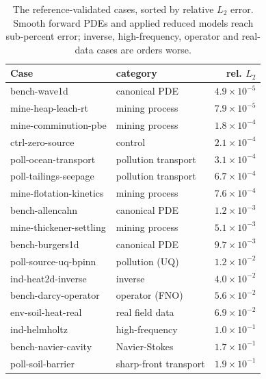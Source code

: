 \documentclass[journal]{IEEEtran}
\begin{document}
\begin{table}[!t]
\centering
\caption{The reference-validated cases, sorted by relative $L_2$ error. Smooth forward PDEs and applied reduced
models reach sub-percent error; inverse, high-frequency, operator and real-data cases are orders worse.}
\label{tab:atlas}
\scriptsize
\begin{tabular}{@{}l l r@{}}
\toprule
Case & category & rel. $L_2$ \\
\midrule
bench-wave1d          & canonical PDE        & $4.9\times10^{-5}$ \\
mine-heap-leach-rt    & mining process       & $7.9\times10^{-5}$ \\
mine-comminution-pbe  & mining process       & $1.8\times10^{-4}$ \\
ctrl-zero-source      & control              & $2.1\times10^{-4}$ \\
poll-ocean-transport  & pollution transport  & $3.1\times10^{-4}$ \\
poll-tailings-seepage & pollution transport  & $6.7\times10^{-4}$ \\
mine-flotation-kinetics & mining process     & $7.6\times10^{-4}$ \\
bench-allencahn       & canonical PDE        & $1.2\times10^{-3}$ \\
mine-thickener-settling & mining process     & $5.1\times10^{-3}$ \\
bench-burgers1d       & canonical PDE        & $9.7\times10^{-3}$ \\
poll-source-uq-bpinn  & pollution (UQ)       & $1.2\times10^{-2}$ \\
ind-heat2d-inverse    & inverse              & $4.0\times10^{-2}$ \\
bench-darcy-operator  & operator (FNO)       & $5.6\times10^{-2}$ \\
env-soil-heat-real    & real field data      & $6.9\times10^{-2}$ \\
ind-helmholtz         & high-frequency       & $1.0\times10^{-1}$ \\
bench-navier-cavity   & Navier-Stokes        & $1.7\times10^{-1}$ \\
poll-soil-barrier     & sharp-front transport& $1.9\times10^{-1}$ \\
\bottomrule
\end{tabular}
\end{table}
\end{document}
